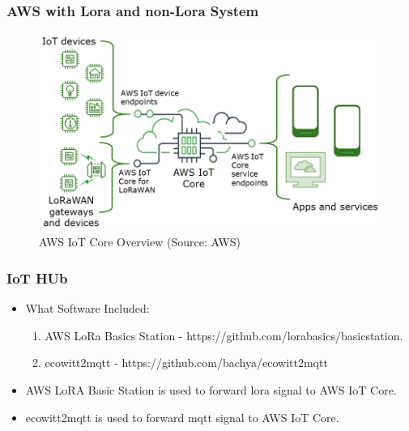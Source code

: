 \documentclass{beamer}
\begin{document}
\begin{frame}
  \frametitle{AWS with Lora and non-Lora System}
  \begin{figure}[h]
  \includegraphics[scale=0.5]{iot-endpoints.png}
    \caption{AWS IoT Core Overview (Source: AWS)}
\end{figure}

\end{frame}

\begin{frame}[t]
  \frametitle{IoT HUb}
  \begin{itemize}
    \item What Software Included:
      \begin{enumerate}
        \item AWS LoRa Basics Station - https://github.com/lorabasics/basicstation.
	\item ecowitt2mqtt - https://github.com/bachya/ecowitt2mqtt  
      \end{enumerate}
  \end{itemize}
  \begin{itemize}
    \item AWS LoRA Basic Station is used to forward lora signal to AWS IoT Core.
    \item ecowitt2mqtt is used to forward mqtt signal to AWS IoT Core.
  \end{itemize}
\end{frame}
\end{document}
